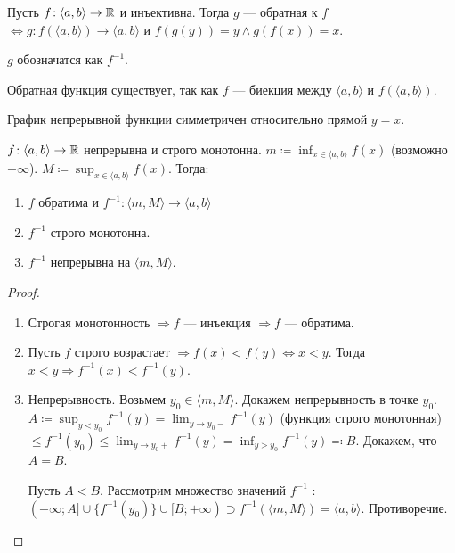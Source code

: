 \begin{definition}
    Пусть $f\!: \langle a, b \rangle \to \mathbb{R}$ и инъективна. Тогда  $g$ --- обратная к  $f$  $\iff g\!: f(\langle a, b\rangle) \to \langle a, b \rangle $ и  $f(g(y)) = y \land g(f(x)) = x$.

    $g$ обозначатся как  $f^{-1}$.
\end{definition}
\begin{remark}
    Обратная функция существует, так как $f$ --- биекция между  $\langle a, b \rangle$ и  $f(\langle a, b \rangle)$.
\end{remark}
\begin{remark}
    График непрерывной функции симметричен относительно прямой $y=x$.
\end{remark}
\begin{theorem}
    $f\!: \langle a, b\rangle \to \mathbb{R}$ непрерывна и строго монотонна. $m \coloneqq \inf_{x \in \langle a, b \rangle} f(x)$ (возможно $-\infty$). $M \coloneqq \sup_{x \in \langle a, b \rangle} f(x)$. Тогда:
    \begin{enumerate}
        \item $f$ обратима и  $f^{-1}\!: \langle m, M \rangle \to \langle a, b \rangle$
        \item  $f^{-1}$ строго монотонна.
        \item  $f^{-1}$ непрерывна на  $\langle m, M \rangle$.
    \end{enumerate}
\end{theorem}
\begin{proof}
    \slashn
    \begin{enumerate}
        \item Строгая монотонность $\Rightarrow f$ --- инъекция  $\Rightarrow f$ --- обратима.
        \item  Пусть  $f$ строго возрастает  $\Rightarrow f(x) < f(y) \iff x < y$.  Тогда $x < y \Rightarrow f^{-1}(x) < f^{-1}(y)$.
        \item Непрерывность. Возьмем  $y_0 \in \langle m, M \rangle$. Докажем непрерывность в точке $y_0$.  $A \coloneqq \sup_{y < y_0} f^{-1}(y) = \lim_{y \to y_0-} f^{-1}(y)$ (функция строго монотонная) $\le f^{-1}(y_0) \le \lim_{y \to y_0+} f^{-1}(y) = \inf_{y > y_0} f^{-1}(y) \eqqcolon B$. Докажем, что $A = B$.

            Пусть $A < B$. Рассмотрим множество значений  $f^{-1}$ : $(-\infty; A] \cup \{f^{-1}(y_0)\} \cup [B; +\infty) \supset f^{-1}(\langle m, M \rangle) = \langle a, b \rangle$. Противоречие. 
    \end{enumerate}
\end{proof}

